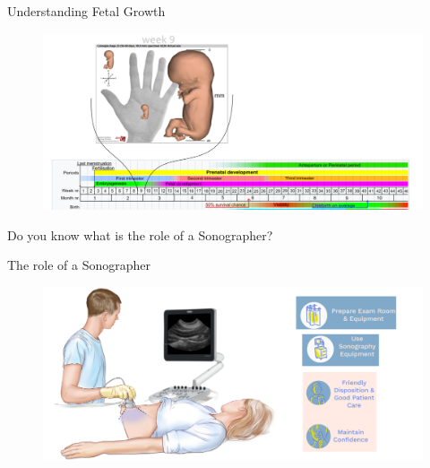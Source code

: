 {
\begin{frame}{Understanding Fetal Growth}
      \begin{figure}
        \centering
        \includegraphics[width=1.0\textwidth]{./figures/fetal-size/versions/drawing-v02.png}
      \end{figure}
\end{frame}
}


{
\begin{frame}{}

\BigSizeFont
Do you know what is the role of a Sonographer?
\end{frame}
}



{
    \begin{frame}{The role of a Sonographer}
      \begin{figure}
        \centering
        \includegraphics[width=1.0\textwidth]{./figures/sonographer/versions/drawing-v01.png}
      \end{figure}
\end{frame}
}
